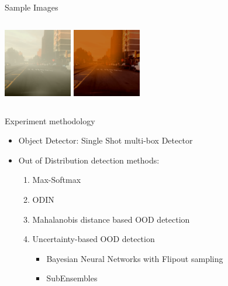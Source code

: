 \documentclass[10pt, aspectratio=169]{beamer}
\begin{document}
\begin{frame}{Sample Images}
\begin{columns}[t]
        \includegraphics[width=0.5\columnwidth,height=3cm]{images/ClimateGAN/bdd/b1c66a42-6f7d68ca_smog_1024.png}%
        \includegraphics[width=0.5\columnwidth,height=3cm]{images/ClimateGAN/bdd/b1c66a42-6f7d68ca_wildfire_1024.png}
    \end{columns}
\end{frame}
\begin{frame}{Experiment methodology}
    \begin{itemize}
        \setlength{\itemsep}{5pt}
        \item Object Detector: Single Shot multi-box Detector \citep{Liu2016SSDSS}
        \item Out of Distribution detection methods:
            \begin{enumerate}
                \setlength{\itemsep}{5pt}
                \item Max-Softmax \citep{hendrycks17baseline}
                \item ODIN \citep{liang2017enhancing}
                \item Mahalanobis distance based OOD detection \citep{Lee2018}
                \item Uncertainty-based OOD detection
                \begin{itemize}
                    \setlength{\itemsep}{5pt}
                    \item Bayesian Neural Networks with Flipout sampling\citep{Wen2018}
                    \item SubEnsembles \citep{ValdenegroToro2019}
                \end{itemize}
            \end{enumerate}
    \end{itemize}
\end{frame}
\end{document}
